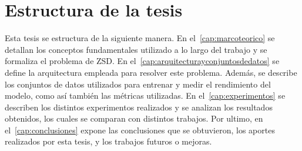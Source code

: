 \section{Estructura de la tesis} \label{sec:estructuradelatesis}

Esta tesis se estructura de la siguiente manera. En el~\autoref{cap:marcoteorico} se detallan los conceptos fundamentales utilizado a lo largo del trabajo y se formaliza el problema de ZSD. En el~\autoref{cap:arquitecturayconjuntosdedatos} se define la arquitectura empleada para resolver este problema. Además, se describe los conjuntos de datos utilizados para entrenar y medir el rendimiento del modelo, como así también las métricas utilizadas. En el~\autoref{cap:experimentos} se describen los distintos experimentos realizados y se analizan los resultados obtenidos, los cuales se comparan con distintos trabajos. Por ultimo, en el~\autoref{cap:conclusiones} expone las conclusiones que se obtuvieron, los aportes realizados por esta tesis, y los trabajos futuros o mejoras.

